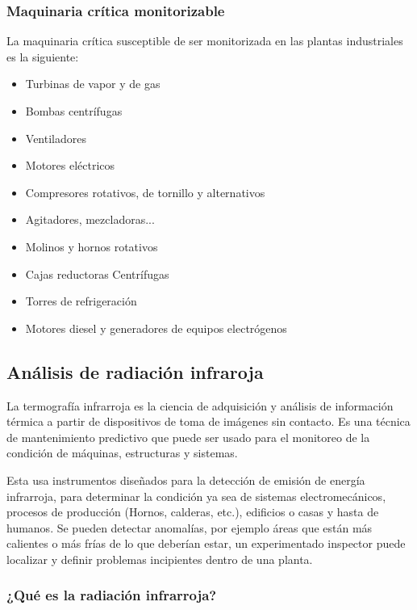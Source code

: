 \subsubsection{Maquinaria crítica monitorizable} 
La maquinaria crítica susceptible de ser monitorizada en las plantas industriales es la siguiente:
\begin{itemize}
\item Turbinas de vapor y de gas
\item Bombas centrífugas
\item Ventiladores
\item Motores eléctricos
\item Compresores rotativos, de tornillo y alternativos
\item Agitadores, mezcladoras...
\item Molinos y hornos rotativos
\item Cajas reductoras Centrífugas
\item Torres de refrigeración
\item Motores diesel y generadores de equipos electrógenos
\end{itemize}





\subsection{Análisis de radiación infraroja}



La termografía infrarroja es la ciencia de adquisición y análisis de información térmica a partir de dispositivos de toma de imágenes sin contacto. Es una técnica de mantenimiento predictivo que puede ser usado para el monitoreo de la condición de máquinas, estructuras y sistemas.

Esta usa instrumentos diseñados para la detección de emisión de energía infrarroja, para determinar la condición ya sea de sistemas electromecánicos, procesos de producción (Hornos, calderas, etc.), edificios o casas y hasta de humanos.
Se pueden detectar anomalías, por ejemplo áreas que están más calientes o más frías de lo que deberían estar, un experimentado inspector puede localizar y definir problemas incipientes dentro de una planta.

\subsubsection{¿Qué es la radiación infrarroja?}

